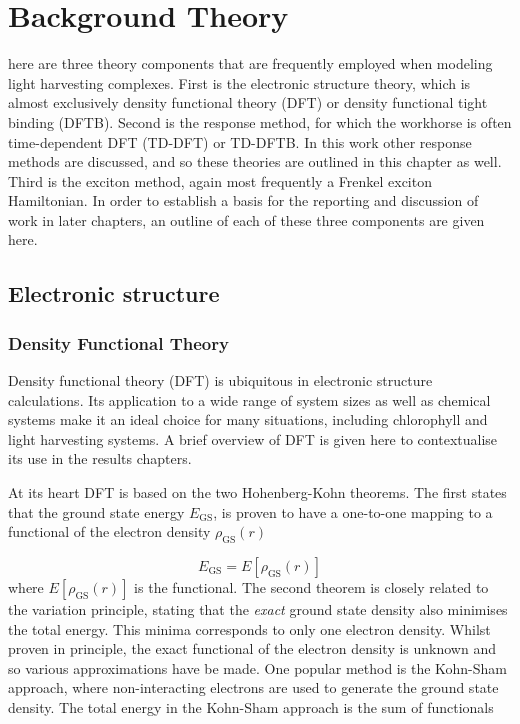 %
%
\let\textcircled=\pgftextcircled
\chapter{Background Theory}
\label{chap:background_theory}

here are three theory components that are frequently employed when modeling
light harvesting complexes. First is the electronic structure theory, which is almost
exclusively density functional theory (DFT) or density functional tight binding (DFTB). 
Second is the response method, for which the workhorse is often time-dependent DFT (TD-DFT) 
or TD-DFTB. In this work other response methods are discussed, and so these theories
are outlined in this chapter as well. Third is the exciton method, again most frequently
a Frenkel exciton Hamiltonian. In order to establish a basis for the reporting and
discussion of work in later chapters, an outline of each of these three components
are given here.

\section{Electronic structure}
\label{sec:electronic_structure}

\subsection{Density Functional Theory}
\label{subsec:dft}

Density functional theory (DFT) is ubiquitous in electronic structure calculations.
Its application to a wide range of system sizes as well as chemical systems make 
it an ideal choice for many situations, including chlorophyll and light harvesting
systems. A brief overview of DFT is given here to contextualise its use in the results
chapters.

At its heart DFT is based on the two Hohenberg-Kohn theorems. The first states that
the ground state energy $E_{\text{GS}}$, is proven to have a one-to-one mapping 
to a functional of the electron density $\rho_{\text{GS}} \left(r\right)$

\begin{equation}
    E_{\text{GS}} = E \left[ \rho_{\text{GS}} \left(r\right)\right]
\end{equation}
%
where $E \left[ \rho_{\text{GS}} \left(r\right)\right]$ is the functional. The second
theorem is closely related to the variation principle, stating that the \emph{exact}
ground state density also minimises the total energy. This minima corresponds to 
only one electron density. Whilst proven in principle, the exact functional of the
electron density is unknown and so various approximations have be made. One popular
method is the Kohn-Sham approach, where non-interacting electrons are used to generate
the ground state density.  The total energy in the Kohn-Sham approach is the sum
of functionals

